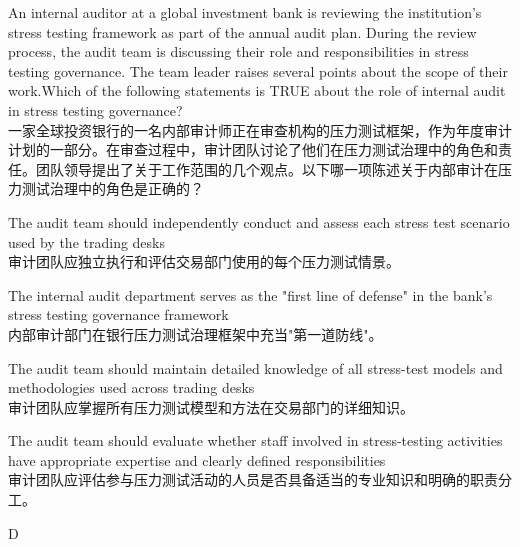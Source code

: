 \documentclass{article}
\newcounter{question} %
\begin{document}
    \begin{question}
        An internal auditor at a global investment bank is reviewing the institution's stress testing framework as part of the annual audit plan. During the review process, the audit team is discussing their role and responsibilities in stress testing governance. The team leader raises several points about the scope of their work.Which of the following statements is TRUE about the role of internal audit in stress testing governance?\\
        一家全球投资银行的一名内部审计师正在审查机构的压力测试框架，作为年度审计计划的一部分。在审查过程中，审计团队讨论了他们在压力测试治理中的角色和责任。团队领导提出了关于工作范围的几个观点。以下哪一项陈述关于内部审计在压力测试治理中的角色是正确的？
        \end{question}
        \begin{choices}
        \item The audit team should independently conduct and assess each stress test scenario used by the trading desks\\
        审计团队应独立执行和评估交易部门使用的每个压力测试情景。
        \item The internal audit department serves as the "first line of defense" in the bank's stress testing governance framework\\
        内部审计部门在银行压力测试治理框架中充当"第一道防线"。
        \item The audit team should maintain detailed knowledge of all stress-test models and methodologies used across trading desks\\
        审计团队应掌握所有压力测试模型和方法在交易部门的详细知识。
        \item The audit team should evaluate whether staff involved in stress-testing activities have appropriate expertise and clearly defined responsibilities\\
        审计团队应评估参与压力测试活动的人员是否具备适当的专业知识和明确的职责分工。
        \end{choices}
    
    \begin{correctanswer}
      D
    \end{correctanswer}
    
\end{document}
